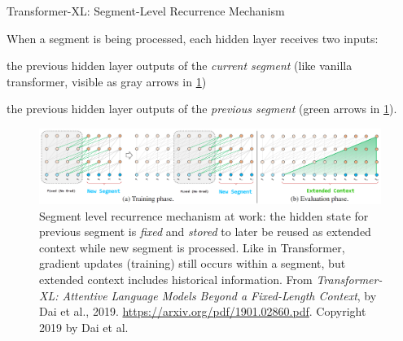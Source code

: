 \begin{frame}{Transformer-XL: Segment-Level Recurrence Mechanism}

    \linespread{0.3}
    
    When a segment is being processed, each hidden layer receives two inputs: 
    
    \begin{itemizeSpaced}{10pt}
        \item the previous hidden layer outputs of the \emph{current segment} (like vanilla transformer, visible as gray arrows in \cref{fig:transXL_extendedContext})
        
        \item the previous hidden layer outputs of the \emph{previous segment} (green arrows in \cref{fig:transXL_extendedContext}).
    \end{itemizeSpaced}
    
    
    
    \begin{figure}[h]
    \vspace{-5pt}
    \centering
    \includegraphics[width=0.99\textwidth]{imgs/transXL_extendedcontext.png}
    \caption{\small Segment level recurrence mechanism at work: the hidden state for previous segment is \emph{fixed} and \emph{stored} to later be reused as extended context while new segment is processed. Like in Transformer, gradient updates (training) still occurs within a segment, but extended context includes historical information. From \emph{Transformer-XL: Attentive Language Models Beyond a Fixed-Length Context}, by Dai et al., 2019. \url{https://arxiv.org/pdf/1901.02860.pdf}. Copyright 2019 by Dai et al.}
    \label{fig:transXL_extendedContext}
    \end{figure}
    
\end{frame}



